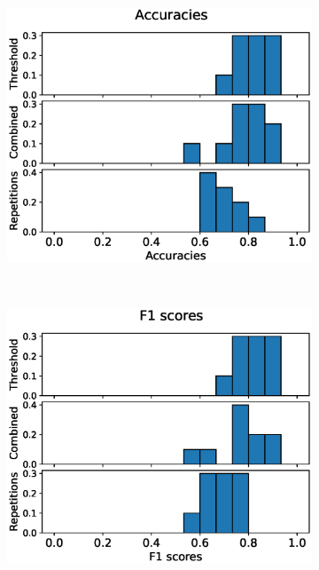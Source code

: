 \begin{figure}
  \centering
  \begin{subfigure}[t]{0.4\textwidth}
    \includegraphics[width=\textwidth]{files/figs/res/femval/acc.eps}
    \caption{}
    \label{fig:femval-acc}
  \end{subfigure}
  ~
  \begin{subfigure}[t]{0.4\textwidth}
    \includegraphics[width=\textwidth]{files/figs/res/femval/f1.eps}
    \caption{}
    \label{fig:femval-f1}
  \end{subfigure}


\end{figure}
